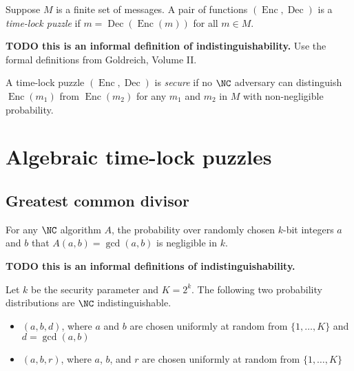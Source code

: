 \documentclass{article}
\newcommand{\todo}[1]{\textbf{TODO #1}}
\newcommand{\Enc}{\operatorname{Enc}}
\newcommand{\Dec}{\operatorname{Dec}}
\begin{document}
\begin{definition}
  Suppose $M$ is a finite set of messages.
  A pair of functions $(\Enc, \Dec)$ is a \emph{time-lock puzzle} if $m = \Dec(\Enc(m))$ for all $m \in M$.
\end{definition}

\begin{definition}
  \todo{this is an informal definition of indistinguishability.}
  Use the formal definitions from Goldreich, Volume II.

  A time-lock puzzle $(\Enc, \Dec)$ is \emph{secure} if no $\NC$ adversary can distinguish $\Enc(m_1)$ from $\Enc(m_2)$ for any $m_1$ and $m_2$ in $M$ with non-negligible probability.
\end{definition}

\section{Algebraic time-lock puzzles}

\subsection{Greatest common divisor}

\begin{assumption}
  For any $\NC$ algorithm $A$, the probability over randomly chosen $k$-bit integers $a$ and $b$ that $A(a, b) = \gcd(a, b)$ is negligible in $k$.
\end{assumption}

\begin{assumption}
  \todo{this is an informal definitions of indistinguishability.}

  Let $k$ be the security parameter and $K = 2^k$.
  The following two probability distributions are $\NC$ indistinguishable.
  \begin{itemize}
  \item $(a, b, d)$, where $a$ and $b$ are chosen uniformly at random from $\{1, \dotsc, K\}$ and $d = \gcd(a, b)$
  \item $(a, b, r)$, where $a$, $b$, and $r$ are chosen uniformly at random from $\{1, \dotsc, K\}$
  \end{itemize}
\end{assumption}
\end{document}
